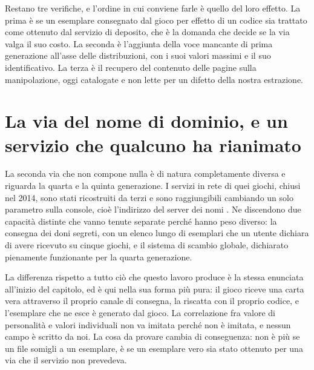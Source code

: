 Restano tre verifiche, e l'ordine in cui conviene farle è quello del loro effetto. La prima è se un esemplare consegnato dal gioco per effetto di un codice sia trattato come ottenuto dal servizio di deposito, che è la domanda che decide se la via valga il suo costo. La seconda è l'aggiunta della voce mancante di prima generazione all'asse delle distribuzioni, con i suoi valori massimi e il suo identificativo. La terza è il recupero del contenuto delle pagine sulla manipolazione, oggi catalogate e non lette per un difetto della nostra estrazione.

\section{La via del nome di dominio, e un servizio che qualcuno ha rianimato}

La seconda via che non compone nulla è di natura completamente diversa e riguarda la quarta e la quinta generazione. I servizi in rete di quei giochi, chiusi nel 2014, sono stati ricostruiti da terzi e sono raggiungibili cambiando un solo parametro sulla console, cioè l'indirizzo del server dei nomi \cite{shacknews-dns}. Ne discendono due capacità distinte che vanno tenute separate perché hanno peso diverso: la consegna dei doni segreti, con un elenco lungo di esemplari che un utente dichiara di avere ricevuto su cinque giochi, e il sistema di scambio globale, dichiarato pienamente funzionante per la quarta generazione.

La differenza rispetto a tutto ciò che questo lavoro produce è la stessa enunciata all'inizio del capitolo, ed è qui nella sua forma più pura: il gioco riceve una carta vera attraverso il proprio canale di consegna, la riscatta con il proprio codice, e l'esemplare che ne esce è generato dal gioco. La correlazione fra valore di personalità e valori individuali non va imitata perché non è imitata, e nessun campo è scritto da noi. La cosa da provare cambia di conseguenza: non è più se un file somigli a un esemplare, è se un esemplare vero sia stato ottenuto per una via che il servizio non prevedeva.

